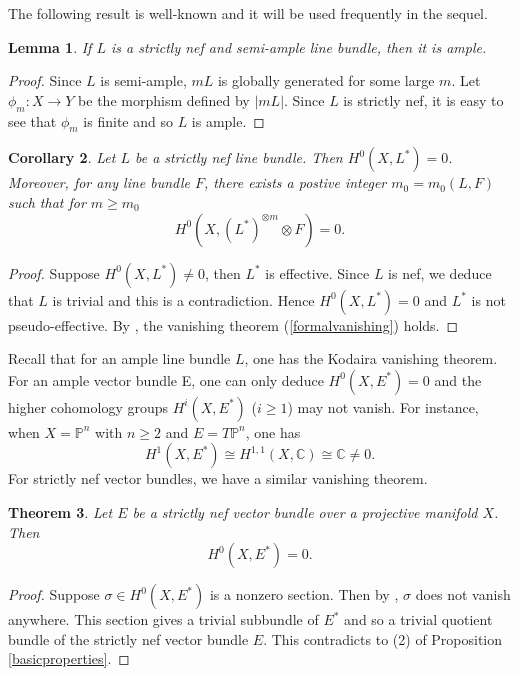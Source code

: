 \documentclass[english,reqno]{amsart}
\newcommand\bbC{{\mathbb C}}
\newcommand\bbP{{\mathbb P}}
\theoremstyle{plain}
\newtheorem{thm}{Theorem}[section]
\newtheorem{lemma}[thm]{Lemma}
\newtheorem{cor}[thm]{Corollary}
\theoremstyle{definition}
\numberwithin{equation}{section} %
\begin{document}
\noindent The following result is well-known and it will be used frequently in the sequel.
\begin{lemma}\label{strictlynefandsemiample} If $L$ is a strictly nef and semi-ample line bundle, then it is ample.
\end{lemma}

\begin{proof} Since $L$ is semi-ample, $mL$ is globally generated for some large  $m$. Let  $\phi_m : X \rightarrow Y$ be
    the morphism defined by $|mL|$. Since $L$ is strictly nef,  it is easy to see that $\phi_m$ is finite  and so $L$ is ample.
\end{proof}


\begin{cor} Let $L$ be a strictly nef line bundle. Then $H^0(X,L^*)=0$. Moreover, for any line bundle $F$, there exists a postive integer $m_0=m_0(L,F)$ such that for $m\geqslant  m_0$
    \begin{equation}H^0(X,(L^*)^{\otimes m}\otimes F)=0.\label{formalvanishing}\end{equation}
\end{cor}
\begin{proof} Suppose $H^0(X,L^*)\neq 0$, then $L^*$ is effective. Since $L$ is nef, we deduce that $L$ is trivial and this is a contradiction. Hence $H^0(X,L^*)=0$ and $L^*$ is not pseudo-effective. By \cite{Yang2019}, the vanishing theorem (\ref{formalvanishing}) holds.
\end{proof}




\noindent Recall that for an ample line bundle $L$, one has the Kodaira vanishing theorem.
For an ample vector bundle E, one can only deduce $H^0(X,E^*)=0$ and the higher cohomology groups $H^i(X,E^*)$ ($i\geqslant  1$) may not vanish. For instance, when $X=\bbP^n$ with $n\geqslant  2$ and $E=T\bbP^n$, one has
$$H^1(X,E^*)\cong H^{1,1}(X,\bbC)\cong \bbC\neq 0.$$
For strictly nef vector bundles, we have a similar vanishing theorem.
\begin{thm} Let $E$ be a strictly nef vector bundle over a projective manifold $X$. Then $$H^0(X,E^*)=0.$$
\end{thm}
\begin{proof} Suppose $\sigma \in H^0(X,E^*)$ is a nonzero section. Then by \cite[Proposition~1.16]{DemaillyPeternellSchneider1994}, $\sigma$ does not vanish anywhere. This section gives a trivial subbundle of $E^*$ and so a trivial quotient bundle of the strictly nef vector bundle $E$. This contradicts to (2) of Proposition \ref{basicproperties}.
\end{proof}
\end{document}
